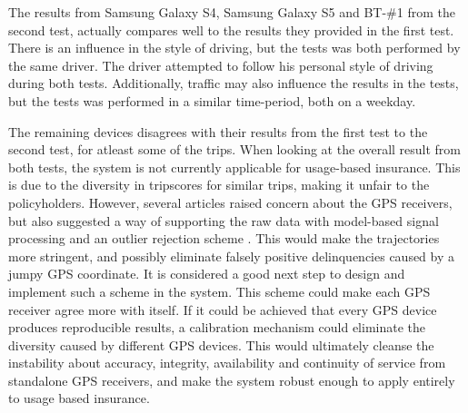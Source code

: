 The results from Samsung Galaxy S4, Samsung Galaxy S5 and BT-\#1 from the second test, actually compares well to the results they provided in the first test. There is an influence in the style of driving, but the tests was both performed by the same driver. The driver attempted to follow his personal style of driving during both tests. Additionally, traffic may also influence the results in the tests, but the tests was performed in a similar time-period, both on a weekday. 

The remaining devices disagrees with their results from the first test to the second test, for atleast some of the trips. When looking at the overall result from both tests, the system is not currently applicable for usage-based insurance. This is due to the diversity in tripscores for similar trips, making it unfair to the policyholders. However, several articles raised concern about the GPS receivers, but also suggested a way of supporting the raw data with model-based signal processing and an outlier rejection scheme \citep{art:challenges_smartphone_ubi} \citep{art:smartphones_for_monitoring_and_ubi} \citep{art:insurtelematics}. This would make the trajectories more stringent, and possibly eliminate falsely positive delinquencies caused by a jumpy GPS coordinate. It is considered a good next step to design and implement such a scheme in the system. This scheme could make each GPS receiver agree more with itself. If it could be achieved that every GPS device produces reproducible results, a calibration mechanism could eliminate the diversity caused by different GPS devices. This would ultimately cleanse the instability about accuracy, integrity, availability and continuity of service from standalone GPS receivers, and make the system robust enough to apply entirely to usage based insurance.


